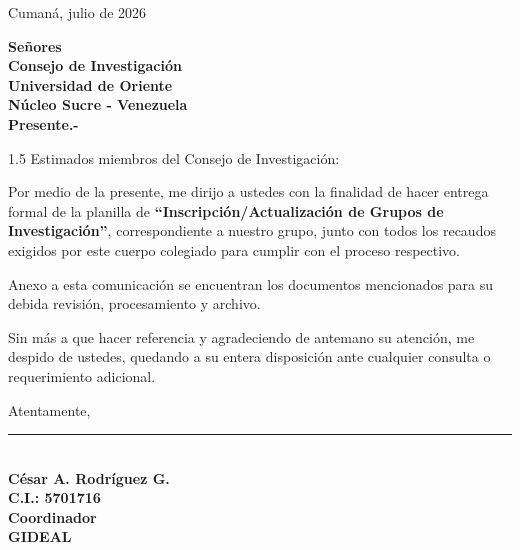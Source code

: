 \documentclass[12pt, a4paper]{article}
\begin{document}
\begin{flushright}
Cumaná, julio de 2026
\end{flushright}

\vspace{1cm}

\noindent
\textbf{Señores}\\
\textbf{Consejo de Investigación}\\
\textbf{Universidad de Oriente}\\
\textbf{Núcleo Sucre - Venezuela}\\
\textbf{Presente.-}

\vspace{1.5cm}

\begin{spacing}{1.5}
Estimados miembros del Consejo de Investigación:

Por medio de la presente, me dirijo a ustedes con la finalidad de hacer entrega formal de la planilla de \textbf{``Inscripción/Actualización de Grupos de Investigación''}, correspondiente a nuestro grupo, junto con todos los recaudos exigidos por este cuerpo colegiado para cumplir con el proceso respectivo.

Anexo a esta comunicación se encuentran los documentos mencionados para su debida revisión, procesamiento y archivo.

Sin más a que hacer referencia y agradeciendo de antemano su atención, me despido de ustedes, quedando a su entera disposición ante cualquier consulta o requerimiento adicional.

\end{spacing}

\vspace{2cm}

\begin{center}
Atentamente,

\vspace{2cm}

\rule{7cm}{0.4pt} \\
\textbf{César A. Rodríguez G.} \\
\textbf{C.I.: 5701716} \\
\textbf{Coordinador} \\
\textbf{GIDEAL}
\end{center}
\end{document}

